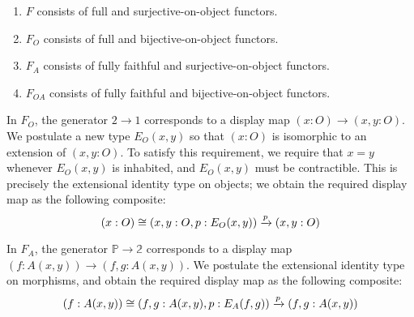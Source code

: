 \documentclass[a4paper]{article}
\begin{document}
\begin{observation}
  \begin{enumerate}
  \item $F$ consists of full and surjective-on-object functors.
  \item $F_O$ consists of full and bijective-on-object functors.
  \item $F_A$ consists of fully faithful and surjective-on-object functors.
  \item $F_{OA}$ consists of fully faithful and bijective-on-object functors.
  \end{enumerate}
\end{observation}

\begin{construction}
  In $F_O$, the generator $2 \to 1$ corresponds to a display map $(x : O) \to (x,y : O)$.
  We postulate a new type $E_O(x,y)$ so that $(x : O)$ is isomorphic to an extension of $(x,y : O)$.
  To satisfy this requirement, we require that $x = y$ whenever $E_O(x,y)$ is inhabited, and $E_O(x,y)$ must be contractible.
  This is precisely the extensional identity type on objects; we obtain the required display map as the following composite:
  \[
    (x : O) \cong (x,y : O, p : E_O(x,y)) \xrightarrow{p} (x, y : O)
  \]
\end{construction}

\begin{construction}
  In $F_A$, the generator $\mathbb{P} \to \mathbb{2}$ corresponds to a display map $(f : A(x,y)) \to (f, g : A(x,y))$.
  We postulate the extensional identity type on morphisms, and obtain the required display map as the following composite:
  \[
    (f : A(x,y)) \cong (f, g : A(x,y), p : E_A(f,g)) \xrightarrow{p} (f,g : A(x,y))
  \]
\end{construction}

\printbibliography
\end{document}

